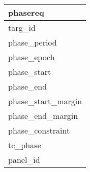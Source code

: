 \documentclass{article}
\begin{document}

\begin{tabular}{|l|} \hline
\textbf{phasereq} \\ \hline
targ\_id \\ \hline
phase\_period \\ \hline
phase\_epoch \\ \hline
phase\_start \\ \hline
phase\_end \\ \hline
phase\_start\_margin \\ \hline
phase\_end\_margin \\ \hline
phase\_constraint \\ \hline
tc\_phase \\ \hline
panel\_id \\ \hline
\end{tabular}
\end{document}

